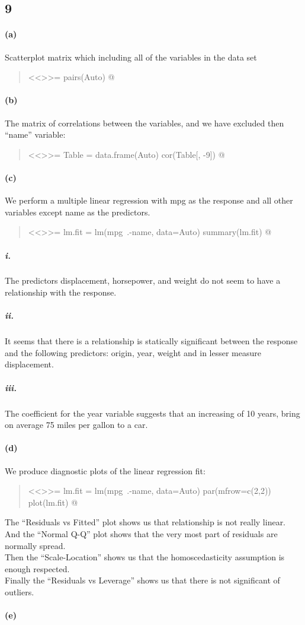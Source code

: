 \documentclass[a4paper, 10pt]{scrartcl}  %
\begin{document}
\subsection{9}
\paragraph{(a)} Scatterplot matrix which including all of the variables
in the data set
\begin{abstract}
<<>>=
pairs(Auto)
@
\end{abstract}
\paragraph{(b)}The matrix of correlations between the variables, and
we have excluded then ``name'' variable:
\begin{abstract}
<<>>=
Table = data.frame(Auto)
cor(Table[, -9])
@
\end{abstract}
\paragraph{(c)} We perform a multiple linear regression with mpg as the
response and all other variables except name as the predictors.
\begin{abstract}
<<>>=
lm.fit = lm(mpg~.-name, data=Auto)
summary(lm.fit)
@
\end{abstract}
\subparagraph{i.} The predictors displacement, horsepower, and weight
do not seem to have a relationship with the response.
\subparagraph{ii.} It seems that there is a relationship is statically
significant between the response and the following predictors: origin,
year, weight and in lesser measure displacement.
\subparagraph{iii.} The coefficient for the year variable suggests that
an increasing of 10 years, bring on average 75 miles per gallon to a
car.
\paragraph{(d)} We produce diagnostic plots of the linear regression 
fit:
\begin{abstract}
<<>>=
lm.fit = lm(mpg~.-name, data=Auto)
par(mfrow=c(2,2))
plot(lm.fit)
@
\end{abstract}
The ``Residuals vs Fitted'' plot shows us that relationship is not 
really linear.\\ And the ``Normal Q-Q'' plot shows that the very most
part of residuals are normally spread.\\ Then the ``Scale-Location''
shows us that the homoscedasticity assumption is enough respected.\\
Finally the ``Residuals vs Leverage'' shows us that there is not 
significant of outliers.
\paragraph{(e)}
\end{document}
